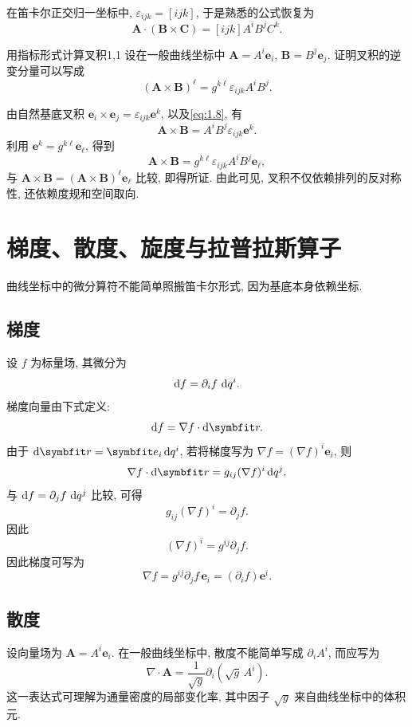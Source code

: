 在笛卡尔正交归一坐标中, $\varepsilon_{ijk}=[ijk]$, 于是熟悉的公式恢复为
\[
\bm{A}\cdot(\bm{B}\times \bm{C})
=
[ijk]A^{i}B^{j}C^{k}.
\]

\begin{example}{用指标形式计算叉积}{1,1}
设在一般曲线坐标中 $\bm{A}=A^{i}\bm{e}_{i}$, $\bm{B}=B^{j}\bm{e}_{j}$. 证明叉积的逆变分量可以写成
\[
(\bm{A}\times\bm{B})^{\ell}
=
g^{k\ell}\varepsilon_{ijk}A^{i}B^{j}.
\]
\begin{solution}
	由自然基底叉积 $\bm{e}_{i}\times\bm{e}_{j} = \varepsilon_{ijk}\bm{e}^{k}$, 以及\eqref{eq:1.8}, 有
	\[
	\bm{A}\times\bm{B}
	=
	A^{i}B^{j}\varepsilon_{ijk}\bm{e}^{k}.
	\]
	利用 $\bm{e}^{k}=g^{k\ell}\bm{e}_{\ell}$, 得到
	\[
	\bm{A}\times\bm{B}
	=
	g^{k\ell}\varepsilon_{ijk}A^{i}B^{j}\bm{e}_{\ell},
	\]
	与 $\bm{A}\times\bm{B}=(\bm{A}\times\bm{B})^{\ell}\bm{e}_{\ell}$ 比较, 即得所证. 由此可见, 叉积不仅依赖排列的反对称性, 还依赖度规和空间取向. 
\end{solution}
\end{example}

\section{梯度、散度、旋度与拉普拉斯算子}

曲线坐标中的微分算符不能简单照搬笛卡尔形式, 因为基底本身依赖坐标. 

\subsection{梯度}

设 $f$ 为标量场, 其微分为
\[
\mathop{}\!\mathrm{d} f
=
\partial_{i} f\,\mathop{}\!\mathrm{d} q^{i}.
\]
梯度向量由下式定义: 
\[
\dif f
=
\nabla f\cdot \dif\bm{r}.
\]
由于 $\dif\bm{r}=\bm{e}_{i} \dif q^{i}$, 若将梯度写为 $\nabla f=(\nabla f)^{i}\bm{e}_{i}$, 则
\[
\nabla f\cdot \dif\bm{r}
=
g_{ij}(\nabla f)^{i} \dif q^{j}.
\]
与 $\mathop{}\!\mathrm{d} f=\partial_{j} f\,\mathop{}\!\mathrm{d} q^{j}$ 比较, 可得
\[
g_{ij}(\nabla f)^{i}=\partial_{j} f.
\]
因此
\[
(\nabla f)^{i}
=
g^{ij}\partial_{j} f.
\]
因此梯度可写为
\begin{equation}
\nabla f
=
g^{ij}\partial_{j} f\,\bm{e}_{i}
=
(\partial_{i} f)\bm{e}^{i}. \label{eq:1.10}
\end{equation}

\subsection{散度}

设向量场为 $\bm{A}=A^{i}\bm{e}_{i}$. 在一般曲线坐标中, 散度不能简单写成 $\partial_{i} A^{i}$, 而应写为
\begin{equation}
\nabla\cdot\bm{A}
=
\frac{1}{\sqrt{g}}\partial_{i}(\sqrt{g}\,A^{i}). \label{eq:1.11}
\end{equation}
这一表达式可理解为通量密度的局部变化率, 其中因子 $\sqrt{g}$ 来自曲线坐标中的体积元. 

